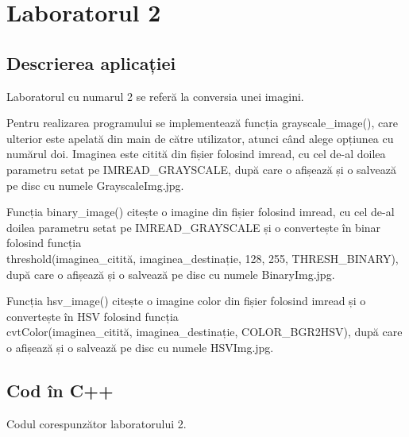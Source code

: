 \documentclass{amsart}
\begin{document}
\newpage

\section{Laboratorul 2}

\subsection{Descrierea aplicației}
\par
Laboratorul cu numarul 2 se referă la conversia unei imagini.
\\ \par
Pentru realizarea programului se implementează funcția grayscale\_image(), care ulterior este apelată din main de către utilizator, atunci când alege opțiunea cu numărul doi. Imaginea este citită din fișier folosind imread, cu cel de-al doilea parametru setat pe IMREAD\_GRAYSCALE, după care o afișează și o salvează pe disc cu numele GrayscaleImg.jpg.
\\ \par
Funcția binary\_image() citește o imagine din fișier folosind imread, cu cel de-al doilea parametru setat pe IMREAD\_GRAYSCALE și o convertește în binar folosind funcția \\ threshold(imaginea\_citită, imaginea\_destinație, 128, 255, THRESH\_BINARY), după care o afișează și o salvează pe disc cu numele BinaryImg.jpg.
\\ \par
Funcția hsv\_image() citește o imagine color din fișier folosind imread și o convertește în HSV folosind funcția\\cvtColor(imaginea\_citită, imaginea\_destinație, COLOR\_BGR2HSV), după care o afișează și o salvează pe disc cu numele HSVImg.jpg.

\subsection{Cod \^{i}n C++}

Codul corespunzător laboratorului 2.
\end{document}
